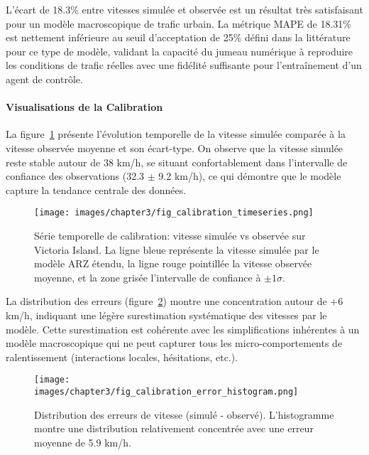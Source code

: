 L'écart de 18.3\% entre vitesses simulée et observée est un résultat très satisfaisant pour un modèle
macroscopique de trafic urbain. La métrique MAPE de 18.31\% est nettement inférieure
au seuil d'acceptation de 25\% défini dans la littérature pour ce type de modèle, validant la capacité du jumeau numérique à reproduire les
conditions de trafic réelles avec une fidélité suffisante pour l'entraînement d'un agent de contrôle.

\paragraph{Visualisations de la Calibration}

La figure~\ref{fig:calibration_timeseries_74} présente l'évolution temporelle de la vitesse
simulée comparée à la vitesse observée moyenne et son écart-type. On observe que la vitesse
simulée reste stable autour de 38 km/h, se situant confortablement dans l'intervalle de confiance des observations
(32.3 $\pm$ 9.2 km/h), ce qui démontre que le modèle capture la tendance centrale des données.

\begin{figure}[htbp]
    \centering
    \texttt{[image: images/chapter3/fig\_calibration\_timeseries.png]}
    \caption{Série temporelle de calibration: vitesse simulée vs observée sur Victoria Island.
        La ligne bleue représente la vitesse simulée par le modèle ARZ étendu,
        la ligne rouge pointillée la vitesse observée moyenne, et la zone grisée
        l'intervalle de confiance à $\pm 1\sigma$.}
    \label{fig:calibration_timeseries_74}
\end{figure}

La distribution des erreurs (figure~\ref{fig:calibration_error_histogram_74}) montre
une concentration autour de +6 km/h, indiquant une légère surestimation systématique
des vitesses par le modèle. Cette surestimation est cohérente avec les simplifications
inhérentes à un modèle macroscopique qui ne peut capturer tous les micro-comportements de ralentissement (interactions locales, hésitations, etc.).

\begin{figure}[htbp]
    \centering
    \texttt{[image: images/chapter3/fig\_calibration\_error\_histogram.png]}
    \caption{Distribution des erreurs de vitesse (simulé - observé). L'histogramme montre
        une distribution relativement concentrée avec une erreur moyenne de 5.9 km/h.}
    \label{fig:calibration_error_histogram_74}
\end{figure}

